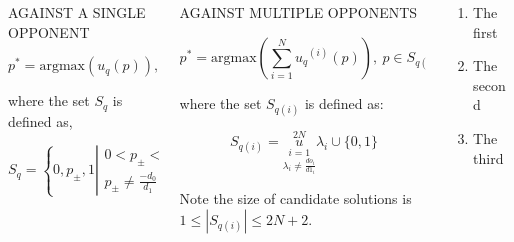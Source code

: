 \documentclass[usenames,dvipsnames,t]{beamer}
\begin{document}
\begin{columns}
    \begin{column}{.4\linewidth}
        \centering
        \textcolor{solarizedOrange}{\large{AGAINST A SINGLE OPPONENT}}

        \begin{minipage}{50cm}
        \begin{block}
            
            \[p^* = \text{argmax}(u_q(p)), \ p \in S_q,\]
            \vspace{0.3cm}

            \small{
            where the set \(S_q\) is defined as,}
        
            \[S_q = \left \{0, p_{\pm}, 1 \left | \begin{array}{l} 0 < p_{\pm} < 1,
            \\ p_{\pm} \neq \frac{-d_0}{d_1} \end{array} \right. \right\}\]
        \end{block}
    \end{minipage}
    
    
    \end{column}
    \begin{column}{.4\linewidth}
        \centering
        \textcolor{solarizedOrange}{\large{AGAINST MULTIPLE OPPONENTS}}

        \begin{minipage}{50cm}
            \begin{block}

            \[p^* = \text{argmax}(\displaystyle \sum_{i=1} ^ {N} {u_q}^{(i)} (p)), \ p \in S_{q(i)},\]
            \vspace{0.3cm}

            \small{
            where the set \(S_{q(i)}\) is defined as:}

            \[ S_{q(i)} =  \overset{2N}{\underset{\lambda_i \neq \frac{do_i}{d1_i}}{\underset{i=1}{u}}} \lambda_i \cup \{0, 1\} \]
             \vspace{0.3cm}

            Note the size of candidate solutions is \( 1 \leq|S_{q(i)}| \leq 2N + 2\).
            \end{block}
        \end{minipage}

        
    \end{column}
    \begin{column}{.2\linewidth}
        \begin{enumerate}
            \item The first
            \item The second
            \item The third
        \end{enumerate}


\end{column}
\end{columns}
\end{document}
